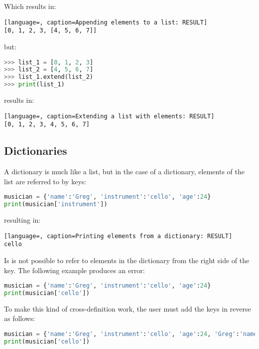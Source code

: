\doublespace
Which results in:
\singlespace
\begin{lstlisting}[language=, caption=Appending elements to a list: RESULT]
[0, 1, 2, 3, [4, 5, 6, 7]]
\end{lstlisting}
\doublespace
but:
\singlespace
\begin{lstlisting}[language=Python, caption=Extending a list with elements]
>>> list_1 = [0, 1, 2, 3]
>>> list_2 = [4, 5, 6, 7]
>>> list_1.extend(list_2)
>>> print(list_1)
\end{lstlisting}
\doublespace
results in:
\singlespace
\begin{lstlisting}[language=, caption=Extending a list with elements: RESULT]
[0, 1, 2, 3, 4, 5, 6, 7]
\end{lstlisting}
\doublespace

    \subsection{Dictionaries}

A dictionary is much like a list, but in the case of a dictionary, elements of the list are referred to by keys:

\singlespace
\begin{lstlisting}[language=Python, caption=Printing elements from a dictionary]
musician = {'name':'Greg', 'instrument':'cello', 'age':24}
print(musician['instrument'])
\end{lstlisting}
\doublespace

resulting in:

\singlespace
\begin{lstlisting}[language=, caption=Printing elements from a dictionary: RESULT]
cello
\end{lstlisting}
\doublespace

Is is not possible to refer to elements in the dictionary from the right side of the key. The following example produces an error:

\singlespace
\begin{lstlisting}[language=Python, caption=Printing elements from a dictionary: ERROR]
musician = {'name':'Greg', 'instrument':'cello', 'age':24}
print(musician['cello'])
\end{lstlisting}
\doublespace

To make this kind of cross-definition work, the user must add the keys in reverse as follows:

\singlespace
\begin{lstlisting}[language=Python, caption=Printing elements from a dictionary: CORRECTION]
musician = {'name':'Greg', 'instrument':'cello', 'age':24, 'Greg':'name', 'cello':'instrument', 24:'age'}
print(musician['cello'])
\end{lstlisting}
\doublespace

